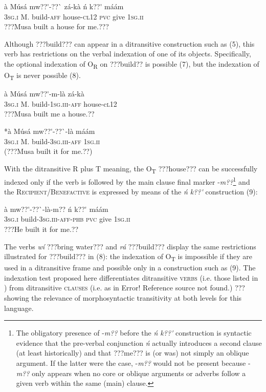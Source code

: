 \documentclass[output=paper]{langsci/langscibook}
\begin{document}
\ea \gll 
\label{bkm:Ref446636188}à    Músá  mw??\'{ }-??\`{ }    zá-kà    \'{n}  k??\'{ }  máám
\\
%
\textsc{3sg.i  }  M.  build-\textsc{aff}  house\textsc{{}-cl12}  \textsc{pvc}  give  \textsc{1sg.ii}
\\\glt
???Musa built a house for me.???
\z

Although ???build??? can appear in a ditransitive construction such as (5), this verb has restrictions on the verbal indexation of one of its objects. Specifically, the optional indexation of O\textsubscript{R} on ???build?? is possible (7), but the indexation of O\textsubscript{T} is never possible (8).

\ea \gll 
\label{bkm:Ref446636228}à    Músá  mw??\'{ }-m-là    zá-kà
\\
%
\textsc{3sg.i  }  M.  build-\textsc{1sg.iii-aff}  house-c\textsc{l12}
\\\glt
???Musa built me a house.??
\z

\ea \gll 
\label{bkm:Ref446636239}*à    Músá  mw??\'{ }-??\`{ }-là    máám
\\
%
\textsc{3sg.i  }  M.  build-\textsc{3sg.iii-aff}  \textsc{1sg.ii}
\\\glt
(???Musa built it for me.??)
\z

With the ditransitive R plus T meaning, the O\textsubscript{T} ???house??? can be successfully indexed only if the verb is followed by the main clause final marker -\textit{m??}\footnote{ The obligatory presence of -\textit{m??} before the \textit{\'{n} k??\'{ }} construction is syntactic evidence that the pre-verbal conjunction \textit{\'{n} }actually introduces a second clause (at least historically) and that ???me??? is (or was) not simply an oblique argument. If the latter were the case, -\textit{m??} would not be present because -\textit{m??} only appears when no core or oblique arguments or adverbs follow a given verb within the same (main) clause.}{ }and the \textsc{Recipient/Benefactive} is expressed by means of the \textit{\'{n} k??\'{ }} construction (9):


\ea \gll 
\label{bkm:Ref446636254}à    mw??\'{ }-??\`{ }-là-m??      \'{n}  k??\'{ }  máám
\\
%
\textsc{3sg.i  }  build-\textsc{3sg.iii-aff-phb}  \textsc{pvc}  give\textsc{  1sg.ii}
\\\glt
???He built it for me.??
\z

The verbs \textit{wí} ???bring water??? and \textit{rá} ???build??? display the same restrictions illustrated for ???build??? in (8): the indexation of O\textsubscript{T} is impossible if they are used in a ditransitive frame and possible only in a construction such as (9). The indexation test proposed here differentiates ditransitive \textsc{verbs} (i.e. those listed in ) from ditransitive \textsc{clauses} (i.e. as in Error! Reference source not found.) ??? showing the relevance of morphosyntactic transitivity at both levels for this language.
\end{document}

